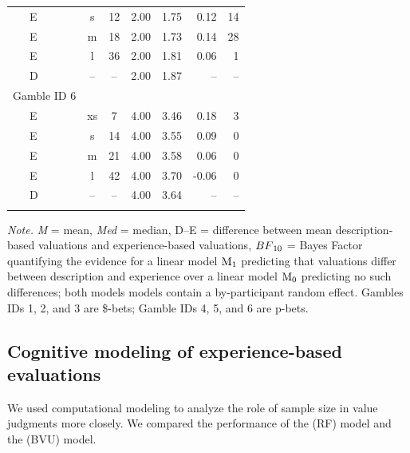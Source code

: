 \documentclass[a4paper, man, floatsintext]{apa6}
\begin{document}
\begin{table}[tbp]
\begin{center}
\begin{threeparttable}
\begin{tabular}{lccccrr}
\ \ \ E & s & 12 & 2.00 & 1.75 & 0.12 & 14\\
\ \ \ E & m & 18 & 2.00 & 1.73 & 0.14 & 28\\
\ \ \ E & l & 36 & 2.00 & 1.81 & 0.06 & 1\\
\ \ \ D & -- & -- & 2.00 & 1.87 & -- & --\\
Gamble ID 6 &  &  &  &  &  & \\
\ \ \ E & xs & 7 & 4.00 & 3.46 & 0.18 & 3\\
\ \ \ E & s & 14 & 4.00 & 3.55 & 0.09 & 0\\
\ \ \ E & m & 21 & 4.00 & 3.58 & 0.06 & 0\\
\ \ \ E & l & 42 & 4.00 & 3.70 & -0.06 & 0\\
\ \ \ D & -- & -- & 4.00 & 3.64 & -- & --\\
\bottomrule
\addlinespace
\end{tabular}
\begin{tablenotes}[para]
\normalsize{\textit{Note.} \textit{M} = mean, \textit{Med} = median, D--E = difference between mean description-based valuations and experience-based valuations, $BF\textsubscript{10}$ = Bayes Factor quantifying the evidence for a linear model $\mathrm{M}\textsubscript{1}$ predicting that valuations differ between description and experience over a linear model $\mathrm{M}\textsubscript{0}$ predicting no such differences; both models models contain a by-participant random effect. Gambles IDs 1, 2, and 3 are \$-bets; Gamble IDs 4, 5, and 6 are p-bets.}
\end{tablenotes}
\end{threeparttable}
\end{center}
\end{table}

\subsection{Cognitive modeling of experience-based evaluations}

We used computational modeling to analyze the role of sample size in
value judgments more closely. We compared the performance of the
 (RF) model and the
 (BVU) model.
\end{document}
